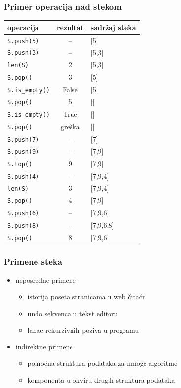 \documentclass[compress,aspectratio=169]{beamer}
\begin{document}
\begin{frame}[fragile,shrink=10]
  \frametitle{Primer operacija nad stekom}
\begin{center}
\begin{tabular}{lcl}
\textbf{operacija} & \textbf{rezultat} & \textbf{sadržaj steka} \\
\hline \hline
\texttt{S.push(5)} & -- & [5] \\ 
\texttt{S.push(3)} & -- & [5,3] \\ 
\texttt{len(S)} & 2 & [5,3] \\ 
\texttt{S.pop()} & 3 & [5] \\ 
\texttt{S.is\_empty()} & False & [5] \\ 
\texttt{S.pop()} & 5 & [] \\ 
\texttt{S.is\_empty()} & True & [] \\ 
\texttt{S.pop()} & greška & [] \\ 
\texttt{S.push(7)} & -- & [7] \\ 
\texttt{S.push(9)} & -- & [7,9] \\ 
\texttt{S.top()} & 9 & [7,9] \\ 
\texttt{S.push(4)} & -- & [7,9,4] \\ 
\texttt{len(S)} & 3 & [7,9,4] \\ 
\texttt{S.pop()} & 4 & [7,9] \\ 
\texttt{S.push(6)} & -- & [7,9,6] \\ 
\texttt{S.push(8)} & -- & [7,9,6,8] \\ 
\texttt{S.pop()} & 8 & [7,9,6] \\ 
\end{tabular}
\end{center}
\end{frame}

\begin{frame}[fragile]
  \frametitle{Primene steka}
  \begin{itemize}
    \item neposredne primene
    \begin{itemize}
      \item istorija poseta stranicama u web čitaču
      \item undo sekvenca u tekst editoru
      \item lanac rekurzivnih poziva u programu
    \end{itemize}
    \item indirektne primene
    \begin{itemize}
      \item pomoćna struktura podataka za mnoge algoritme
      \item komponenta u okviru drugih struktura podataka
    \end{itemize}
  \end{itemize}
\end{frame}
\end{document}
